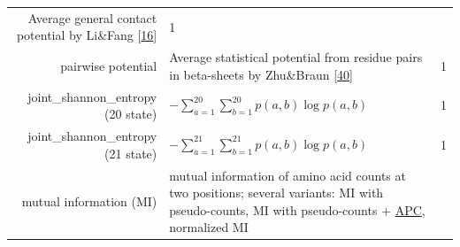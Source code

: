 \documentclass[12pt,a4paper,twoside]{book}
\theoremstyle{definition}
\theoremstyle{definition}
\theoremstyle{remark}
\begin{document}
\begin{longtable}[]{@{}rlc@{}}
\begin{minipage}[t]{0.50\columnwidth}
Average general contact potential by Li\&Fang
{[}\protect\hyperlink{ref-Li2011}{16}{]}\strut
\end{minipage} & \begin{minipage}[t]{0.18\columnwidth}\centering\strut
1\strut
\end{minipage}\tabularnewline
\begin{minipage}[t]{0.23\columnwidth}\raggedleft\strut
pairwise potential\strut
\end{minipage} & \begin{minipage}[t]{0.50\columnwidth}\raggedright\strut
Average statistical potential from residue pairs in beta-sheets by
Zhu\&Braun {[}\protect\hyperlink{ref-Zhu1999}{40}{]}\strut
\end{minipage} & \begin{minipage}[t]{0.18\columnwidth}\centering\strut
1\strut
\end{minipage}\tabularnewline
\begin{minipage}[t]{0.23\columnwidth}\raggedleft\strut
joint\_shannon\_entropy (20 state)\strut
\end{minipage} & \begin{minipage}[t]{0.50\columnwidth}\raggedright\strut
\(- \sum_{a=1}^{20}\sum_{b=1}^{20} p(a,b) \log p(a,b)\)\strut
\end{minipage} & \begin{minipage}[t]{0.18\columnwidth}\centering\strut
1\strut
\end{minipage}\tabularnewline
\begin{minipage}[t]{0.23\columnwidth}\raggedleft\strut
joint\_shannon\_entropy (21 state)\strut
\end{minipage} & \begin{minipage}[t]{0.50\columnwidth}\raggedright\strut
\(- \sum_{a=1}^{21}\sum_{b=1}^{21} p(a,b) \log p(a,b)\)\strut
\end{minipage} & \begin{minipage}[t]{0.18\columnwidth}\centering\strut
1\strut
\end{minipage}\tabularnewline
\begin{minipage}[t]{0.23\columnwidth}\raggedleft\strut
mutual information (MI)\strut
\end{minipage} & \begin{minipage}[t]{0.50\columnwidth}\raggedright\strut
mutual information of amino acid counts at two positions; several
variants: MI with pseudo-counts, MI with pseudo-counts +
\protect\hyperlink{abbrev}{APC}, normalized MI\strut
\end{minipage} & \begin{minipage}[t]{0.18\columnwidth}\centering\strut

\end{minipage}
\end{longtable}
\end{document}
